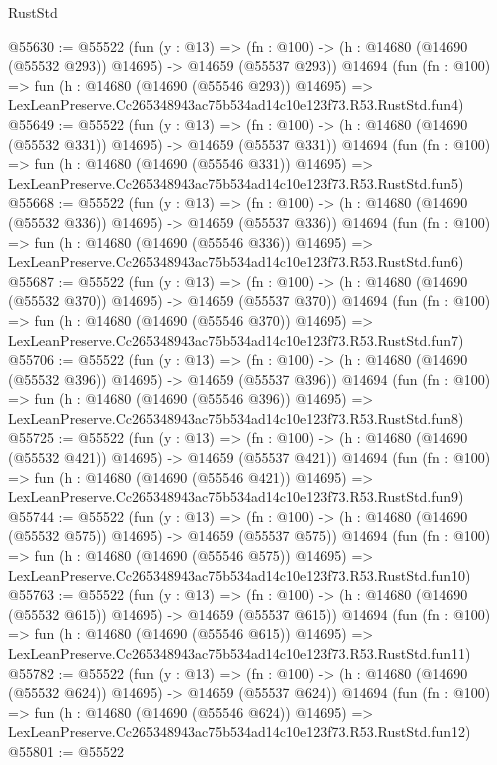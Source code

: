 \begin{lexlean}{RustStd}
\begin{coremodule}
@55630 := @55522
    (fun (y : @13) =>
    (fn : @100) -> (h : @14680 (@14690 (@55532 @293)) @14695) -> @14659 (@55537 @293))
    @14694
    (fun (fn : @100) =>
    fun (h : @14680 (@14690 (@55546 @293)) @14695) =>
    LexLeanPreserve.Cc265348943ac75b534ad14c10e123f73.R53.RustStd.fun4)
@55649 := @55522
    (fun (y : @13) =>
    (fn : @100) -> (h : @14680 (@14690 (@55532 @331)) @14695) -> @14659 (@55537 @331))
    @14694
    (fun (fn : @100) =>
    fun (h : @14680 (@14690 (@55546 @331)) @14695) =>
    LexLeanPreserve.Cc265348943ac75b534ad14c10e123f73.R53.RustStd.fun5)
@55668 := @55522
    (fun (y : @13) =>
    (fn : @100) -> (h : @14680 (@14690 (@55532 @336)) @14695) -> @14659 (@55537 @336))
    @14694
    (fun (fn : @100) =>
    fun (h : @14680 (@14690 (@55546 @336)) @14695) =>
    LexLeanPreserve.Cc265348943ac75b534ad14c10e123f73.R53.RustStd.fun6)
@55687 := @55522
    (fun (y : @13) =>
    (fn : @100) -> (h : @14680 (@14690 (@55532 @370)) @14695) -> @14659 (@55537 @370))
    @14694
    (fun (fn : @100) =>
    fun (h : @14680 (@14690 (@55546 @370)) @14695) =>
    LexLeanPreserve.Cc265348943ac75b534ad14c10e123f73.R53.RustStd.fun7)
@55706 := @55522
    (fun (y : @13) =>
    (fn : @100) -> (h : @14680 (@14690 (@55532 @396)) @14695) -> @14659 (@55537 @396))
    @14694
    (fun (fn : @100) =>
    fun (h : @14680 (@14690 (@55546 @396)) @14695) =>
    LexLeanPreserve.Cc265348943ac75b534ad14c10e123f73.R53.RustStd.fun8)
@55725 := @55522
    (fun (y : @13) =>
    (fn : @100) -> (h : @14680 (@14690 (@55532 @421)) @14695) -> @14659 (@55537 @421))
    @14694
    (fun (fn : @100) =>
    fun (h : @14680 (@14690 (@55546 @421)) @14695) =>
    LexLeanPreserve.Cc265348943ac75b534ad14c10e123f73.R53.RustStd.fun9)
@55744 := @55522
    (fun (y : @13) =>
    (fn : @100) -> (h : @14680 (@14690 (@55532 @575)) @14695) -> @14659 (@55537 @575))
    @14694
    (fun (fn : @100) =>
    fun (h : @14680 (@14690 (@55546 @575)) @14695) =>
    LexLeanPreserve.Cc265348943ac75b534ad14c10e123f73.R53.RustStd.fun10)
@55763 := @55522
    (fun (y : @13) =>
    (fn : @100) -> (h : @14680 (@14690 (@55532 @615)) @14695) -> @14659 (@55537 @615))
    @14694
    (fun (fn : @100) =>
    fun (h : @14680 (@14690 (@55546 @615)) @14695) =>
    LexLeanPreserve.Cc265348943ac75b534ad14c10e123f73.R53.RustStd.fun11)
@55782 := @55522
    (fun (y : @13) =>
    (fn : @100) -> (h : @14680 (@14690 (@55532 @624)) @14695) -> @14659 (@55537 @624))
    @14694
    (fun (fn : @100) =>
    fun (h : @14680 (@14690 (@55546 @624)) @14695) =>
    LexLeanPreserve.Cc265348943ac75b534ad14c10e123f73.R53.RustStd.fun12)
@55801 := @55522

\end{coremodule}
\end{lexlean}
